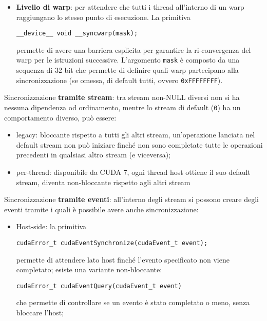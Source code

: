 \begin{questions}
\begin{solution}
\begin{itemize}
            \item \textbf{Livello di warp}: per attendere che tutti i thread all'interno di un warp raggiungano lo stesso punto di esecuzione. La primitiva
            \begin{verbatim}
__device__ void __syncwarp(mask);
            \end{verbatim}
            permette di avere una barriera esplicita per garantire la ri-convergenza del warp per le istruzioni successive. L'argomento \texttt{mask} è composto da una sequenza di 32 bit che permette di definire quali warp partecipano alla sincronizzazione (se omessa, di default tutti, ovvero \texttt{0xFFFFFFFF}).
        \end{itemize}
        
        Sincronizzazione \textbf{tramite stream}: tra stream non-NULL diversi non si ha nessuna dipendenza od ordinamento, mentre lo stream di default (\texttt{0}) ha un comportamento diverso, può essere: 
        \begin{itemize}
            \item legacy: bloccante rispetto a tutti gli altri stream, un'operazione lanciata nel default stream non può iniziare finché non sono completate tutte le operazioni precedenti in qualsiasi altro stream (e viceversa);
            
            \item per-thread: disponibile da CUDA 7, ogni thread host ottiene il suo default stream, diventa non-bloccante rispetto agli altri stream
        \end{itemize}
        
        Sincronizzazione \textbf{tramite eventi}: all'interno degli stream si possono creare degli eventi tramite i quali è possibile avere anche sincronizzazione:
        \begin{itemize}
            \item Host-side: la primitiva
            \begin{verbatim}
cudaError_t cudaEventSynchronize(cudaEvent_t event);
            \end{verbatim}
            permette di attendere lato host finché l'evento specificato non viene completato; esiste una variante non-bloccante:
            \begin{verbatim}
cudaError_t cudaEventQuery(cudaEvent_t event)
            \end{verbatim}
            che permette di controllare se un evento è stato completato o meno, senza bloccare l'host;
            

\end{itemize}
\end{solution}
\end{questions}
